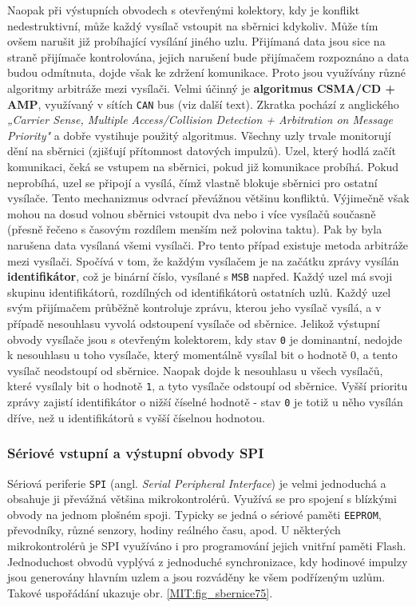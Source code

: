         Naopak při výstupních obvodech s otevřenými kolektory, kdy je konflikt nedestruktivní, může 
        každý vysílač vstoupit na sběrnici kdykoliv. Může tím ovšem narušit již probíhající 
        vysílání jiného uzlu. Přijímaná data jsou sice na straně přijímače kontrolována, jejich 
        narušení bude přijímačem rozpoznáno a data budou odmítnuta, dojde však ke zdržení 
        komunikace. Proto jsou využívány různé algoritmy arbitráže mezi vysílači. Velmi účinný je 
        \textbf{algoritmus CSMA/CD + AMP}, využívaný v sítích \texttt{CAN} bus (viz další text). 
        Zkratka pochází z anglického \emph{„Carrier Sense, Multiple Access/Collision Detection + 
        Arbitration on Message Priority"} a dobře vystihuje použitý algoritmus. Všechny uzly trvale 
        monitorují dění na sběrnici (zjišťují přítomnost datových impulzů). Uzel, který 
        hodlá začít komunikaci, čeká se vstupem na sběrnici, pokud již komunikace probíhá. Pokud 
        neprobíhá, uzel se připojí a vysílá, čímž vlastně blokuje sběrnici pro ostatní vysílače. 
        Tento mechanizmus odvrací převážnou většinu konfliktů. Výjimečně však mohou na dosud volnou 
        sběrnici vstoupit dva nebo i více vysílačů současně (přesně řečeno s časovým rozdílem 
        menším než polovina taktu). Pak by byla narušena data vysílaná všemi vysílači. Pro tento 
        případ existuje metoda arbitráže mezi vysílači. Spočívá v tom, že každým vysílačem je na 
        začátku zprávy vysílán \textbf{identifikátor}, což je binární číslo, vysílané s 
        \texttt{MSB} napřed. Každý uzel má svoji skupinu identifikátorů, rozdílných od 
        identifikátorů ostatních uzlů. Každý uzel svým přijímačem průběžně kontroluje zprávu, 
        kterou jeho vysílač vysílá, a v případě nesouhlasu vyvolá odstoupení vysílače od sběrnice. 
        Jelikož výstupní obvody vysílače jsou s otevřeným kolektorem, kdy stav \texttt{0} je 
        dominantní, nedojde k nesouhlasu u toho vysílače, který momentálně vysílal bit o hodnotě 0, 
        a tento vysílač neodstoupí od sběrnice. Naopak dojde k nesouhlasu u všech vysílačů, které 
        vysílaly bit o hodnotě \texttt{1}, a tyto vysílače  odstoupí od sběrnice. Vyšší prioritu 
        zprávy zajistí identifikátor o nižší číselné hodnotě - stav \texttt{0} je totiž u něho 
        vysílán dříve, než u identifikátorů s vyšší číselnou hodnotou.
        
      \subsubsection{Sériové vstupní a výstupní obvody SPI}
        Sériová periferie \texttt{SPI} (angl. \emph{Serial Peripheral Interface}) je velmi 
        jednoduchá a obsahuje ji převážná většina mikrokontrolérů. Využívá se pro spojení s 
        blízkými obvody na jednom plošném spoji. Typicky se jedná o sériové paměti \texttt{EEPROM}, 
        převodníky, různé senzory, hodiny reálného času, apod. U některých mikrokontrolérů je SPI 
        využíváno i pro programování jejich vnitřní paměti Flash. Jednoduchost obvodů vyplývá z 
        jednoduché synchronizace, kdy hodinové impulzy jsou generovány hlavním uzlem a jsou 
        rozváděny ke všem podřízeným uzlům. Takové uspořádání ukazuje obr. \ref{MIT:fig_sbernice75}.

